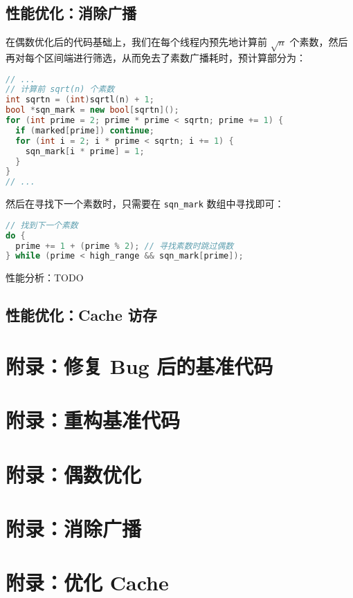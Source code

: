 \documentclass[11pt]{article}
\begin{document}
  \subsection{性能优化：消除广播}
  在偶数优化后的代码基础上，我们在每个线程内预先地计算前 $\sqrt{n}$ 个素数，然后再对每个区间端进行筛选，从而免去了素数广播耗时，预计算部分为：
  \begin{file}
    \begin{lstlisting}[language=C++]
// ...
// 计算前 sqrt(n) 个素数
int sqrtn = (int)sqrtl(n) + 1;
bool *sqn_mark = new bool[sqrtn]();
for (int prime = 2; prime * prime < sqrtn; prime += 1) {
  if (marked[prime]) continue;
  for (int i = 2; i * prime < sqrtn; i += 1) {
    sqn_mark[i * prime] = 1;
  }
}
// ...
    \end{lstlisting}
  \end{file}
  然后在寻找下一个素数时，只需要在 \verb|sqn_mark| 数组中寻找即可：
  \begin{file}
    \begin{lstlisting}[language=C++]
// 找到下一个素数
do {
  prime += 1 + (prime % 2); // 寻找素数时跳过偶数
} while (prime < high_range && sqn_mark[prime]);
    \end{lstlisting}
  \end{file}
  性能分析：TODO
  \subsection{性能优化：Cache 访存}

  \appendix
  \section{附录：修复 Bug 后的基准代码}
  \section{附录：重构基准代码}
  \section{附录：偶数优化}
  \section{附录：消除广播}
  \section{附录：优化 Cache}
\end{document}
